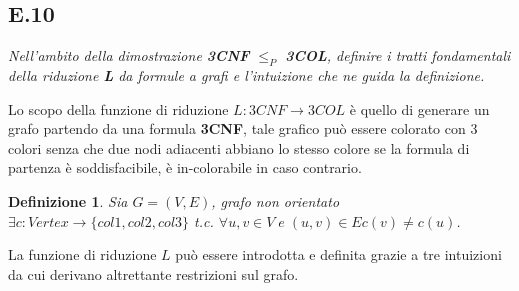 \documentclass[a4paper]{article}
\newtheorem*{definition}{Definizione}
\begin{document}
\subsection{E.10}
\emph{Nell’ambito della dimostrazione \textbf{3CNF} $\leq_P$ \textbf{3COL}, definire i tratti fondamentali della riduzione \textbf{L} da formule a grafi e l’intuizione che ne guida la definizione.}


Lo scopo della funzione di riduzione $L : 3CNF \rightarrow 3COL$ è quello di generare un grafo partendo da una formula \textbf{3CNF}, tale grafico può essere colorato con 3 colori senza che due nodi adiacenti abbiano lo stesso colore se la formula di partenza è soddisfacibile, è in-colorabile in caso contrario.
\begin{definition}Sia $G = (V,E)$, grafo non orientato $\exists c : Vertex \rightarrow \{col1,col2,col3\}$ t.c. $\forall u,v \in V \; e \; (u,v) \in E c(v) \neq c(u)$.
\end{definition}
La funzione di riduzione $L$ può essere introdotta e definita grazie a tre intuizioni da cui derivano altrettante restrizioni sul grafo.
\end{document}

